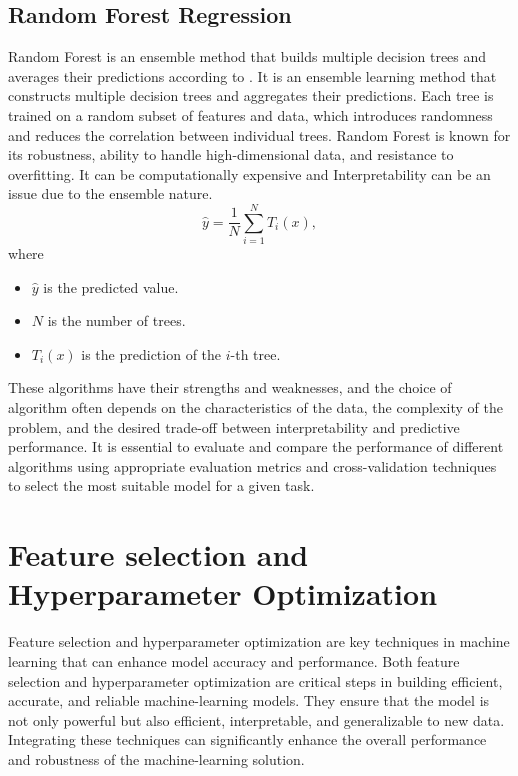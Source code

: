 \documentclass{book}
\numberwithin{equation}{section}
\numberwithin{figure}{section}
\begin{document}
\vspace{-5mm} %
\subsection{Random Forest Regression}
\label{rfr}
\vspace{-5mm} %
Random Forest is an ensemble method that builds multiple decision trees and averages their predictions according to \cite{random_forest}. It is an ensemble learning method that constructs multiple decision trees and aggregates their predictions. Each tree is trained on a random subset of features and data, which introduces randomness and reduces the correlation between individual trees. Random Forest is known for its robustness, ability to handle high-dimensional data, and resistance to overfitting. It can be computationally expensive and Interpretability can be an issue due to the ensemble nature. \\
\begin{equation}
\hat{y} = \frac{1}{N} \sum_{i=1}^{N} T_i(x),
\end{equation}
where
\begin{itemize}
    \item $\hat{y}$ is the predicted value.
    \item $N$ is the number of trees.
    \item $T_i(x)$ is the prediction of the $i$-th tree.
\end{itemize}
These algorithms have their strengths and weaknesses, and the choice of algorithm often depends on the characteristics of the data, the complexity of the problem, and the desired trade-off between interpretability and predictive performance. It is essential to evaluate and compare the performance of different algorithms using appropriate evaluation metrics and cross-validation techniques to select the most suitable model for a given task.
\section{Feature selection and Hyperparameter Optimization}
\label{feature and hyperparameter}
Feature selection and hyperparameter optimization are key techniques in machine learning that can enhance model accuracy and performance. Both feature selection and hyperparameter optimization are critical steps in building efficient, accurate, and reliable machine-learning models. They ensure that the model is not only powerful but also efficient, interpretable, and generalizable to new data. Integrating these techniques can significantly enhance the overall performance and robustness of the machine-learning solution.
\end{document}
